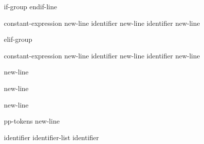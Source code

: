 \begin{bnf}
\br
    if-group   endif-line
\end{bnf}

\begin{bnf}\obeyspaces
{}\br
     constant-expression new-line \br
     identifier new-line \br
     identifier new-line 
\end{bnf}

\begin{bnf}
\br
    elif-group 
\end{bnf}

\begin{bnf}\obeyspaces
{}\br
     constant-expression new-line \br
     identifier new-line \br
     identifier new-line 
\end{bnf}

\begin{bnf}\obeyspaces
{}\br
     new-line 
\end{bnf}

\begin{bnf}\obeyspaces
{}\br
     new-line
\end{bnf}

\begin{bnf}
\br
     new-line
\end{bnf}

\begin{bnf}
\br
    pp-tokens new-line
\end{bnf}

\begin{bnf}
\br
\end{bnf}

\begin{bnf}
\br
    identifier\br
    identifier-list \terminal{,} identifier
\end{bnf}

\begin{bnf}
\br
\end{bnf}

